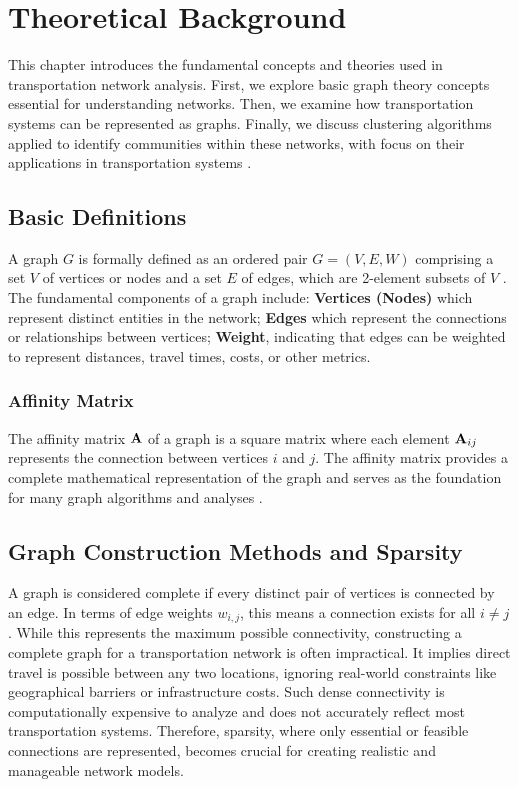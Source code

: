 \chapter{Theoretical Background}
\label{ch:basics}
This chapter introduces the fundamental concepts and theories used in transportation network analysis. First, we explore basic graph theory concepts essential for understanding networks. Then, we examine how transportation systems can be represented as graphs. Finally, we discuss clustering algorithms applied to identify communities within these networks, with focus on their applications in transportation systems .

\section{Basic Definitions}
\label{se:BasicDefinitions}

A graph $G$ is formally defined as an ordered pair $G = (V, E, W)$ comprising a set $V$ of vertices or nodes and a set $E$ of edges, which are 2-element subsets of $V$ . The fundamental components of a graph include: \textbf{Vertices (Nodes)} which represent distinct entities in the network; \textbf{Edges} which represent the connections or relationships between vertices; \textbf{Weight}, indicating that edges can be weighted to represent distances, travel times, costs, or other metrics.

\subsection{Affinity Matrix}
\label{subsec:AffinityMatrix}

The affinity matrix $\mathbf{A}$ of a graph is a square matrix where each element $\mathbf{A}_{ij}$ represents the connection between vertices $i$ and $j$. The affinity matrix provides a complete mathematical representation of the graph and serves as the foundation for many graph algorithms and analyses .


\section{Graph Construction Methods and Sparsity}
\label{se:GraphConstructionMethodsAndSparsity}

A graph is considered complete if every distinct pair of vertices is connected by an edge. In terms of edge weights \(w_{i,j}\), this means a connection exists for all \(i \neq j\). While this represents the maximum possible connectivity, constructing a complete graph for a transportation network is often impractical. It implies direct travel is possible between any two locations, ignoring real-world constraints like geographical barriers or infrastructure costs. Such dense connectivity is computationally expensive to analyze and does not accurately reflect most transportation systems. Therefore, sparsity, where only essential or feasible connections are represented, becomes crucial for creating realistic and manageable network models.

